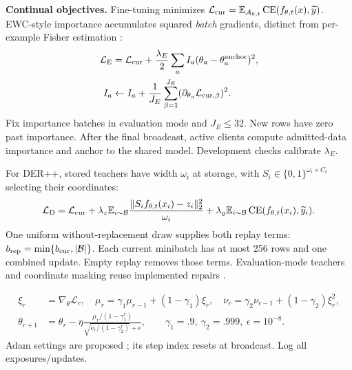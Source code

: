 \documentclass[10pt,a4paper]{article}
\newcommand{\CE}{\operatorname{CE}}
\begin{document}
\textbf{Continual objectives.} Fine-tuning minimizes $\mathcal L_{\rm cur}=\mathbb E_{\mathcal A_{k,t}}\CE(f_{\theta,t}(x),\widetilde y)$. EWC-style importance accumulates squared \emph{batch} gradients, distinct from per-example Fisher estimation \cite{ewc}:
\begin{equation}
\begin{aligned}
\mathcal L_{\rm E}&=\mathcal L_{\rm cur}+\frac{\lambda_E}{2}\sum_aI_a(\theta_a-\theta_a^{\rm anchor})^2,\\
I_a&\leftarrow I_a+\frac1{J_E}\sum_{\beta=1}^{J_E}(\partial_{\theta_a}\mathcal L_{{\rm cur},\beta})^2.
\end{aligned}
\label{eq:ewc}
\end{equation}
Fix importance batches in evaluation mode and $J_E\le32$. New rows have zero past importance. After the final broadcast, active clients compute admitted-data importance and anchor to the shared model. Development checks calibrate $\lambda_E$.

For DER++, stored teachers have width $\omega_i$ at storage, with $S_i\in\{0,1\}^{\omega_i\times C_t}$ selecting their coordinates:
\begin{equation}
\mathcal L_{\rm D}=\mathcal L_{\rm cur}
+\lambda_z\mathbb E_{i\sim\mathcal B}\frac{\|S_if_{\theta,t}(x_i)-z_i\|_2^2}{\omega_i}
+\lambda_y\mathbb E_{i\sim\mathcal B}\CE(f_{\theta,t}(x_i),\widetilde y_i).
\label{eq:der}
\end{equation}
One uniform without-replacement draw supplies both replay terms: $b_{\rm rep}=\min\{b_{\rm cur},|\mathcal B|\}$. Each current minibatch has at most 256 rows and one combined update. Empty replay removes those terms. Evaluation-mode teachers and coordinate masking reuse implemented repairs \cite{der}.

\begin{equation}
\begin{aligned}
\xi_r&=\nabla_\theta\mathcal L_r,\quad\mu_r=\gamma_1\mu_{r-1}+(1-\gamma_1)\xi_r,\quad
\nu_r=\gamma_2\nu_{r-1}+(1-\gamma_2)\xi_r^2,\\
\theta_{r+1}&=\theta_r-\eta\frac{\mu_r/(1-\gamma_1^r)}{\sqrt{\nu_r/(1-\gamma_2^r)}+\epsilon},\qquad
\gamma_1=.9,\ \gamma_2=.999,\ \epsilon=10^{-8}.
\end{aligned}
\label{eq:adam}
\end{equation}
Adam settings are proposed \cite{adam}; its step index resets at broadcast. Log all exposures/updates.
\end{document}
